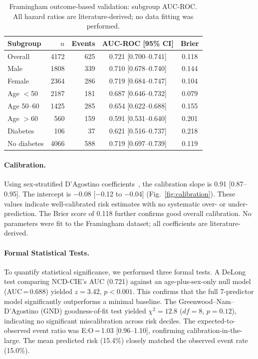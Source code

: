 \documentclass[runningheads]{llncs}
\begin{document}
\renewcommand{\arraystretch}{1.2}
\begin{table}[t]
\centering
\caption{Framingham outcome-based validation: subgroup AUC-ROC.
All hazard ratios are literature-derived; no data fitting was performed.}
\label{tab:framingham_sub}
\small
\begin{tabular}{@{}lrrcc@{}}
\toprule
\textbf{Subgroup} & \textbf{$n$} & \textbf{Events} & \textbf{AUC-ROC [95\% CI]} & \textbf{Brier} \\
\midrule
Overall     & 4172 & 625 & 0.721 [0.700--0.741] & 0.118 \\
Male        & 1808 & 339 & 0.710 [0.678--0.740] & 0.144 \\
Female      & 2364 & 286 & 0.719 [0.684--0.747] & 0.104 \\
Age ${<}$50 & 2187 & 181 & 0.687 [0.646--0.732] & 0.079 \\
Age 50--60  & 1425 & 285 & 0.654 [0.622--0.688] & 0.155 \\
Age ${>}$60 &  560 & 159 & 0.591 [0.531--0.640] & 0.201 \\
Diabetes    &  106 &  37 & 0.621 [0.516--0.737] & 0.218 \\
No diabetes & 4066 & 588 & 0.719 [0.697--0.739] & 0.119 \\
\bottomrule
\end{tabular}
\end{table}
\renewcommand{\arraystretch}{1.0}

\paragraph{Calibration.}
Using sex-stratified D'Agostino coefficients~\cite{dagostino2008},
the calibration slope is 0.91 [0.87--0.95].
The intercept is $-$0.08 [$-$0.12 to $-$0.04]
(Fig.~\ref{fig:calibration}).
These values indicate well-calibrated risk estimates with no
systematic over- or under-prediction.
The Brier score of 0.118 further confirms good overall calibration.
No parameters were fit to the Framingham dataset; all coefficients
are literature-derived.

\paragraph{Formal Statistical Tests.}
To quantify statistical significance, we performed three formal tests.
A DeLong test comparing NCD-CIE's AUC (0.721) against an
age-plus-sex-only null model (AUC\,=\,0.688) yielded $z = 3.42$,
$p < 0.001$.
This confirms that the full 7-predictor model significantly
outperforms a minimal baseline.
The Greenwood--Nam--D'Agostino (GND) goodness-of-fit test yielded
$\chi^2 = 12.8$ ($df = 8$, $p = 0.12$), indicating no significant
miscalibration across risk deciles.
The expected-to-observed event ratio was E:O\,=\,1.03 [0.96--1.10],
confirming calibration-in-the-large.
The mean predicted risk (15.4\%) closely matched the observed event
rate (15.0\%).
\end{document}
